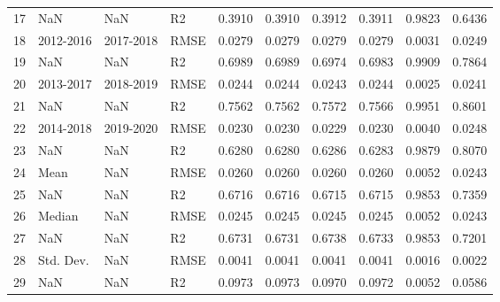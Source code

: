 \begin{tabular}{llllrrrrrr}
17 &        NaN &        NaN &      R2 &  0.3910 &  0.3910 &  0.3912 &       0.3911 &  0.9823 &  0.6436 \\
18 &  2012-2016 &  2017-2018 &    RMSE &  0.0279 &  0.0279 &  0.0279 &       0.0279 &  0.0031 &  0.0249 \\
19 &        NaN &        NaN &      R2 &  0.6989 &  0.6989 &  0.6974 &       0.6983 &  0.9909 &  0.7864 \\
20 &  2013-2017 &  2018-2019 &    RMSE &  0.0244 &  0.0244 &  0.0243 &       0.0244 &  0.0025 &  0.0241 \\
21 &        NaN &        NaN &      R2 &  0.7562 &  0.7562 &  0.7572 &       0.7566 &  0.9951 &  0.8601 \\
22 &  2014-2018 &  2019-2020 &    RMSE &  0.0230 &  0.0230 &  0.0229 &       0.0230 &  0.0040 &  0.0248 \\
23 &        NaN &        NaN &      R2 &  0.6280 &  0.6280 &  0.6286 &       0.6283 &  0.9879 &  0.8070 \\
24 &       Mean &        NaN &    RMSE &  0.0260 &  0.0260 &  0.0260 &       0.0260 &  0.0052 &  0.0243 \\
25 &        NaN &        NaN &      R2 &  0.6716 &  0.6716 &  0.6715 &       0.6715 &  0.9853 &  0.7359 \\
26 &     Median &        NaN &    RMSE &  0.0245 &  0.0245 &  0.0245 &       0.0245 &  0.0052 &  0.0243 \\
27 &        NaN &        NaN &      R2 &  0.6731 &  0.6731 &  0.6738 &       0.6733 &  0.9853 &  0.7201 \\
28 &  Std. Dev. &        NaN &    RMSE &  0.0041 &  0.0041 &  0.0041 &       0.0041 &  0.0016 &  0.0022 \\
29 &        NaN &        NaN &      R2 &  0.0973 &  0.0973 &  0.0970 &       0.0972 &  0.0052 &  0.0586 \\
\bottomrule
\end{tabular}
